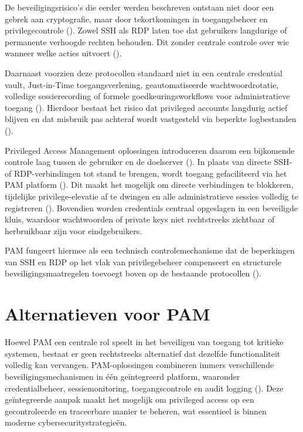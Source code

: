 De beveiligingsrisico’s die eerder werden beschreven ontstaan niet door een gebrek aan cryptografie, maar door tekortkomingen in toegangsbeheer en privilegecontrole (\cite{nist_zta_800_207}). Zowel SSH als RDP laten toe dat gebruikers langdurige of permanente verhoogde rechten behouden. Dit zonder centrale controle over wie wanneer welke acties uitvoert (\cite{nist_zta_800_207}).

Daarnaast voorzien deze protocollen standaard niet in een centrale credential vault, Just-in-Time toegangsverlening, geautomatiseerde wachtwoordrotatie, volledige sessierecording of formele goedkeuringsworkflows voor administratieve toegang (\cite{hsu2021pam}). Hierdoor bestaat het risico dat privileged accounts langdurig actief blijven en dat misbruik pas achteraf wordt vastgesteld via beperkte logbestanden (\cite{mitre_t1003,mitre_lateral_movement}).

Privileged Access Management oplossingen introduceren daarom een bijkomende controle laag tussen de gebruiker en de doelserver (\cite{nist_zta_800_207}). In plaats van directe SSH- of RDP-verbindingen tot stand te brengen, wordt toegang gefaciliteerd via het PAM platform (\cite{hsu2021pam}). Dit maakt het mogelijk om directe verbindingen te blokkeren, tijdelijke privilege-elevatie af te dwingen en alle administratieve sessies volledig te registreren (\cite{hsu2021pam}). Bovendien worden credentials centraal opgeslagen in een beveiligde kluis, waardoor wachtwoorden of private keys niet rechtstreeks zichtbaar of herbruikbaar zijn voor eindgebruikers.

PAM fungeert hiermee als een technisch controlemechanisme dat de beperkingen van SSH en RDP op het vlak van privilegebeheer compenseert en structurele beveiligingsmaatregelen toevoegt boven op de bestaande protocollen (\cite{nist_zta_800_207}).

\section{Alternatieven voor PAM}
Hoewel PAM een centrale rol speelt in het beveiligen van toegang tot kritieke systemen, bestaat er geen rechtstreeks alternatief dat dezelfde functionaliteit volledig kan vervangen. PAM-oplossingen combineren immers verschillende beveiligingsmechanismen in één geïntegreerd platform, waaronder credentialbeheer, sessiemonitoring, toegangscontrole en audit logging (\cite{GartnerMagicQuadrantPAM2025}). Deze geïntegreerde aanpak maakt het mogelijk om privileged access op een gecontroleerde en traceerbare manier te beheren, wat essentieel is binnen moderne cybersecuritystrategieën.

